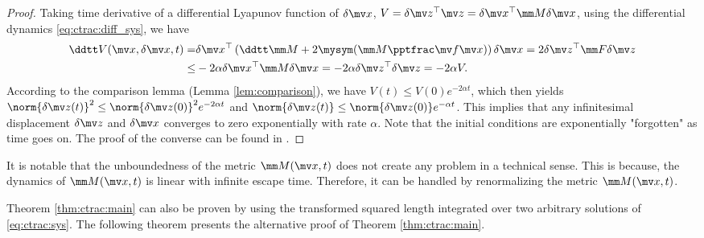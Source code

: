 \begin{proof}
    Taking time derivative of a differential Lyapunov function of $\delta\bdx$, $V=\delta\bdz^\top\bdz=\delta\bdx^\top\mm M\delta\bdx$, using the differential dynamics \eqref{eq:ctrac:diff_sys}, we have
    \begin{equation}
        \begin{aligned}
            \ddtt V (\bdx, \delta\bdx, t)
            =&
            \delta\bdx^\top
            \left(
                \ddtt\mm M
                +
                2\mysym(\mm M\tpfpx)
            \right)
            \delta\bdx
            =
            2
            \delta\bdz^\top
            \mm F
            \delta \bdz
            \\
            \le&
            -2\alpha
            \delta\bdx^\top
            \mm M
            \delta\bdx
            =
            -
            2\alpha
            \delta\bdz^\top
            \delta\bdz
            =
            -2\alpha V
            .
        \end{aligned}
    \end{equation}
    According to the comparison lemma (Lemma \ref{lem:comparison}), we have $V(t)\le V(0)e^{-2\alpha t}$, which then yields $\norm{\delta\bdz(t)}^2\le\norm{\delta\bdz(0)}^2e^{-2\alpha t}$ and $\norm{\delta\bdz(t)}\le\norm{\delta\bdz(0)}e^{-\alpha t}$.
    This implies that any infinitesimal displacement $\delta\bdz$ and $\delta\bdx$ converges to zero exponentially with rate $\alpha$.
    Note that the initial conditions are exponentially "forgotten" as time goes on.
    The proof of the converse can be found in \cite[Sec. 3.5]{LOHMILLER:1998aa}.
\end{proof}

It is notable that the unboundedness of the metric $\mm M(\bdx, t)$ does not create any problem in a technical sense.
This is because, the dynamics of $\mm M(\bdx, t)$ is linear with infinite escape time.
Therefore, it can be handled by renormalizing the metric $\mm M(\bdx, t)$.

\hfill

Theorem \ref{thm:ctrac:main} can also be proven by using the transformed squared length integrated over two arbitrary solutions of \eqref{eq:ctrac:sys}.
The following theorem presents the alternative proof of Theorem \ref{thm:ctrac:main}.

